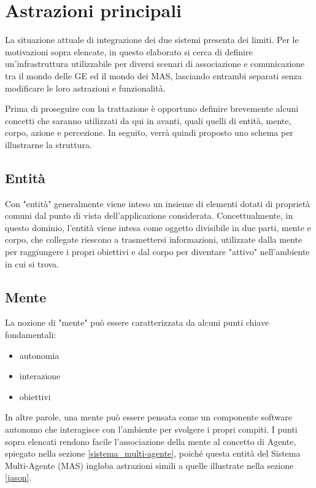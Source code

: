 
\section{Astrazioni principali}

La situazione attuale di integrazione dei due sistemi presenta dei limiti. Per le motivazioni sopra elencate, in questo elaborato si cerca di definire un'infrastruttura utilizzabile per diversi scenari di associazione e comunicazione tra il mondo delle GE ed il mondo dei MAS, lasciando entrambi separati senza modificare le loro astrazioni e funzionalità.

\medskip

Prima di proseguire con la trattazione è opportuno definire brevemente alcuni concetti che saranno utilizzati da qui in avanti, quali quelli di entità, mente, corpo, azione e percezione. In seguito, verrà quindi proposto uno schema per illustrarne la struttura.

\subsection{Entità}

Con "entità" generalmente viene inteso un insieme di elementi dotati di proprietà comuni dal punto di vista dell’applicazione considerata.\cite{treccani}
Concettualmente, in questo dominio, l'entità viene intesa come oggetto divisibile in due parti, mente e corpo, che collegate riescono a trasmettersi informazioni, utilizzate dalla mente per raggiungere i propri obiettivi e dal corpo per diventare "attivo" nell'ambiente in cui si trova.

\subsection{Mente}

La nozione di "mente" può essere caratterizzata da alcuni punti chiave fondamentali:
\begin{itemize}
   \item autonomia
   \item interazione
   \item obiettivi
\end{itemize}
In altre parole, una mente può essere pensata come un componente software autonomo che interagisce con l'ambiente per svolgere i propri compiti.
I punti sopra elencati rendono facile l'associazione della mente al concetto di Agente, spiegato nella sezione \ref{sistema_multi-agente}, poiché questa entità del Sistema Multi-Agente (MAS) ingloba astrazioni simili a quelle illustrate nella sezione \ref{jason}.

